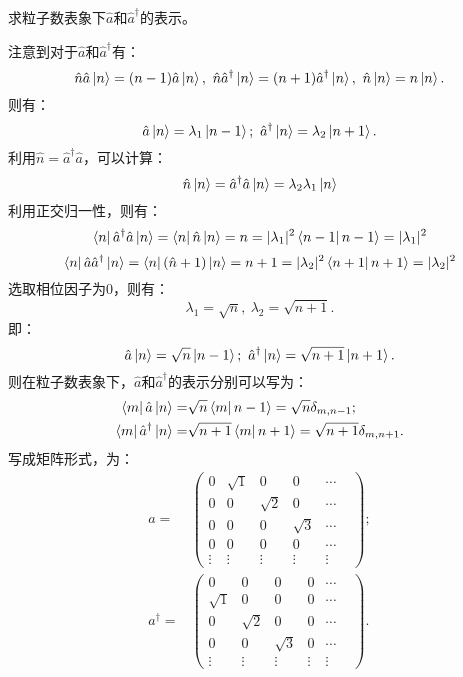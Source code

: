 \documentclass[reqno,a4paper,12pt]{amsart}
\begin{document}
求粒子数表象下$\hat{a}$和$\hat{a}^\dagger$的表示。
\begin{tcolorbox}[breakable, colback = black!5!white, colframe = black]
注意到对于$\hat{a}$和$\hat{a}^\dagger$有：
\[
	\hat{n}\hat{a} \ket{n} = (n-1) \hat{a}\ket{n}, ~ \hat{n}\hat{a}^\dagger \ket{n} = (n+1) \hat{a}^\dagger\ket{n}, ~ \hat{n} \ket{n} = n \ket{n}.
\]
则有：
\[
	\hat{a} \ket{n} = \lambda_1 \ket{n-1}; ~ \hat{a}^\dagger \ket{n} = \lambda_2 \ket{n+1}.
\]
利用$\hat{n} = \hat{a}^\dagger \hat{a}$，可以计算：
\[
	\hat{n}\ket{n} = \hat{a}^\dagger \hat{a} \ket{n} = \lambda_2\lambda_1 \ket{n}
\]
利用正交归一性，则有：
\[
	\bra{n}\hat{a}^\dagger\hat{a} \ket{n} = \bra{n} \hat{n} \ket{n} = n = \vert \lambda_1 \vert^2 \bra{n-1} n-1 \rangle = \vert \lambda_1 \vert^2
\]
\[
	\bra{n}\hat{a}\hat{a}^\dagger\ket{n} = \bra{n}(\hat{n}+1)\ket{n} = n+1 = \vert \lambda_2 \vert^2 \bra{n+1} n+1 \rangle = \vert \lambda_2 \vert^2
\]
选取相位因子为$0$，则有：
\[
	\lambda_1 = \sqrt{n}, ~ \lambda_2 = \sqrt{n+1}.
\]
即：
\[
	\hat{a} \ket{n} = \sqrt{n} \ket{n-1}; ~ \hat{a}^\dagger \ket{n} = \sqrt{n+1} \ket{n+1}.
\]
则在粒子数表象下，$\hat{a}$和$\hat{a}^\dagger$的表示分别可以写为：
\begin{align*}
	\bra{m} \hat{a} \ket{n} =& \sqrt{n} \bra{m} n-1 \rangle = \sqrt{n} \delta_{m,n-1}; \\
	\bra{m} \hat{a}^\dagger \ket{n} =& \sqrt{n+1} \bra{m} n+1 \rangle = \sqrt{n+1} \delta_{m,n+1}.
\end{align*}
写成矩阵形式，为：
\begin{align*}
	a =& \left( \begin{matrix}
		0 & \sqrt{1} & 0 & 0 & \cdots \\
		0 & 0 & \sqrt{2} & 0 & \cdots \\
		0 & 0 & 0 & \sqrt{3} & \cdots \\
		0 & 0 & 0 & 0 & \cdots \\
		\vdots & \vdots & \vdots & \vdots & \vdots & 
	\end{matrix} \right); \\
	a^\dagger =& \left( \begin{matrix}
		0 & 0 & 0 & 0 & \cdots \\
		\sqrt{1} & 0 & 0 & 0 & \cdots \\
		0 & \sqrt{2} & 0 & 0 & \cdots \\
		0 & 0 & \sqrt{3} & 0 & \cdots \\
		\vdots & \vdots & \vdots & \vdots & \vdots & 
	\end{matrix} \right).
\end{align*}
\end{tcolorbox}
\end{document}
